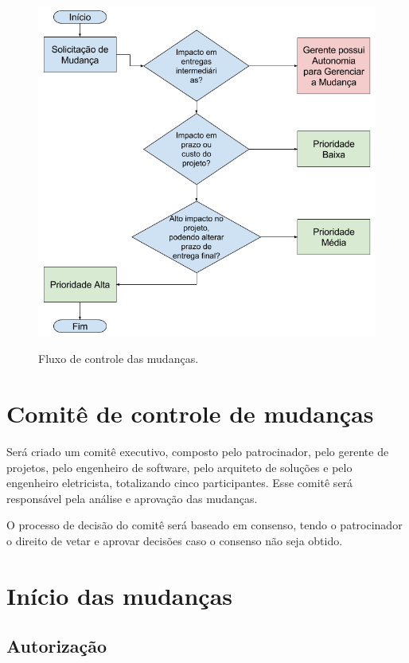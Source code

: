 \begin{figure}[h]
	\includegraphics[width=\textwidth]{images/fluxo-controle-mudancas}
	\label{img:change-control-flow}
	\caption{Fluxo de controle das mudanças.}
\end{figure}

\section{Comitê de controle de mudanças}

Será criado um comitê executivo, composto pelo patrocinador, pelo gerente de projetos, pelo engenheiro de software, pelo arquiteto de soluções e pelo engenheiro eletricista, totalizando cinco participantes. Esse comitê será responsável pela análise e aprovação das mudanças.

O processo de decisão do comitê será baseado em consenso, tendo o patrocinador o direito de vetar e aprovar decisões caso o consenso não seja obtido.

\section{Início das mudanças}

\subsection{Autorização}

